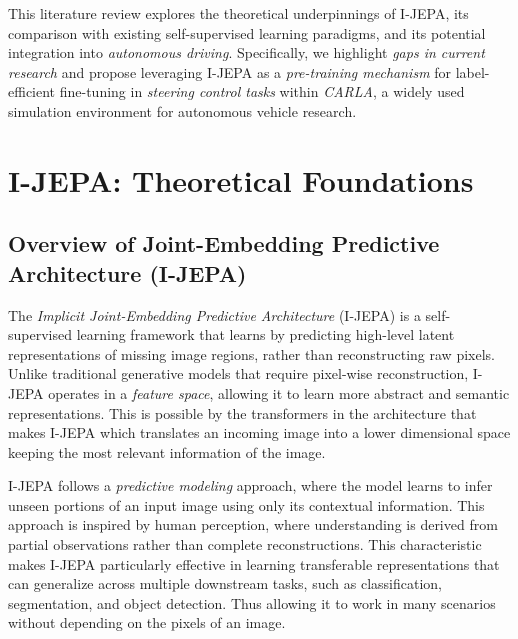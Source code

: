 \documentclass{article}
\begin{document}
This literature review explores the theoretical underpinnings of I-JEPA, its comparison with existing self-supervised learning paradigms, and its potential integration into \textit{autonomous driving}. Specifically, we highlight \textit{gaps in current research} and propose leveraging I-JEPA as a \textit{pre-training mechanism} for label-efficient fine-tuning in \textit{steering control tasks} within \textit{CARLA}, a widely used simulation environment for autonomous vehicle research.
\section{I-JEPA: Theoretical Foundations}

\subsection{Overview of Joint-Embedding Predictive Architecture (I-JEPA)}
The \textit{Implicit Joint-Embedding Predictive Architecture} (I-JEPA) \citep{jean2023ijepa} is a self-supervised learning framework that learns by predicting high-level latent representations of missing image regions, rather than reconstructing raw pixels. Unlike traditional generative models that require pixel-wise reconstruction, I-JEPA operates in a \textit{feature space}, allowing it to learn more abstract and semantic representations. This is possible by the transformers in the architecture that makes I-JEPA which translates an incoming image into a lower dimensional space keeping the most relevant information of the image. 

I-JEPA follows a \textit{predictive modeling} approach, where the model learns to infer unseen portions of an input image using only its contextual information. This approach is inspired by human perception, where understanding is derived from partial observations rather than complete reconstructions. This characteristic makes I-JEPA particularly effective in learning transferable representations that can generalize across multiple downstream tasks, such as classification, segmentation, and object detection. Thus allowing it to work in many scenarios without depending on the pixels of an image. 
\end{document}
